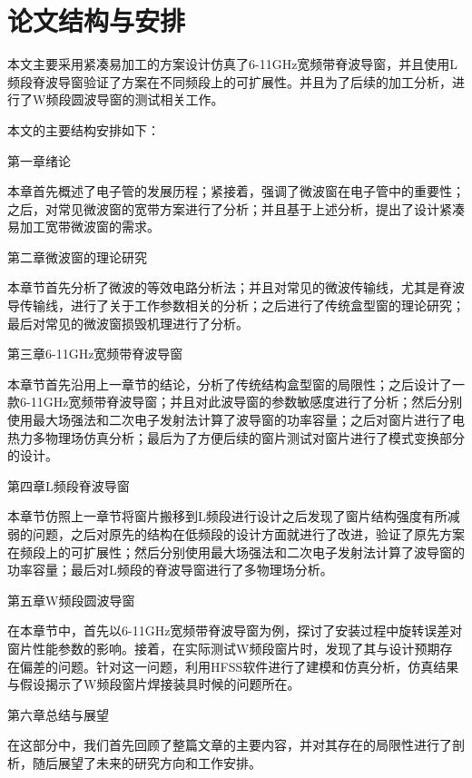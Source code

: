 \documentclass[master]{thesis-uestc}
\begin{document}
\section{论文结构与安排}
本文主要采用紧凑易加工的方案设计仿真了6-11GHz宽频带脊波导窗，并且使用L频段脊波导窗验证了方案在不同频段上的可扩展性。并且为了后续的加工分析，进行了W频段圆波导窗的测试相关工作。

本文的主要结构安排如下：

第一章\hspace{6pt}绪论

本章首先概述了电子管的发展历程；紧接着，强调了微波窗在电子管中的重要性；之后，对常见微波窗的宽带方案进行了分析；并且基于上述分析，提出了设计紧凑易加工宽带微波窗的需求。

第二章\hspace{6pt}微波窗的理论研究

本章节首先分析了微波的等效电路分析法；并且对常见的微波传输线，尤其是脊波导传输线，进行了关于工作参数相关的分析；之后进行了传统盒型窗的理论研究；最后对常见的微波窗损毁机理进行了分析。

第三章\hspace{6pt}6-11GHz宽频带脊波导窗

本章节首先沿用上一章节的结论，分析了传统结构盒型窗的局限性；之后设计了一款6-11GHz宽频带脊波导窗；并且对此波导窗的参数敏感度进行了分析；然后分别使用最大场强法和二次电子发射法计算了波导窗的功率容量；之后对窗片进行了电热力多物理场仿真分析；最后为了方便后续的窗片测试对窗片进行了模式变换部分的设计。

第四章\hspace{6pt}L频段脊波导窗

本章节仿照上一章节将窗片搬移到L频段进行设计之后发现了窗片结构强度有所减弱的问题，之后对原先的结构在低频段的设计方面就进行了改进，验证了原先方案在频段上的可扩展性；然后分别使用最大场强法和二次电子发射法计算了波导窗的功率容量；最后对L频段的脊波导窗进行了多物理场分析。

第五章\hspace{6pt}W频段圆波导窗

在本章节中，首先以6-11GHz宽频带脊波导窗为例，探讨了安装过程中旋转误差对窗片性能参数的影响。接着，在实际测试W频段窗片时，发现了其与设计预期存在偏差的问题。针对这一问题，利用HFSS软件进行了建模和仿真分析，仿真结果与假设揭示了W频段窗片焊接装具时候的问题所在。

第六章\hspace{6pt}总结与展望

在这部分中，我们首先回顾了整篇文章的主要内容，并对其存在的局限性进行了剖析，随后展望了未来的研究方向和工作安排。
\end{document}

